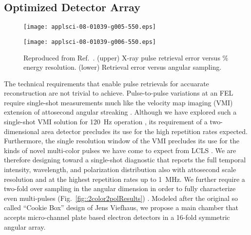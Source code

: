 \subsection*{Optimized Detector Array}
%

\begin{wrapfigure}[26]{r}{3in}
\vspace{-3\baselineskip}
\centerline{\texttt{[image: applsci-08-01039-g005-550.eps]}}
\centerline{\texttt{[image: applsci-08-01039-g006-550.eps]}}
\vspace{-1\baselineskip}
\caption{\label{fig::thomasfigs}Reproduced from Ref.~\cite{Feurer2018}. (upper) X-ray pulse retrieval error versus \% energy resolution.  
(lower) Retrieval error versus angular sampling.}
\end{wrapfigure}

The technical requirements that enable pulse retrievals for accuarate reconstruction are not trivial to achieve.
Pulse-to-pulse variations at an FEL require single-shot measurements much like the velocity map imaging (VMI) \cite{VrakkingRSI} extension of attosecond angular streaking \cite{attoclockVMI2013}.
Although we have explored such a single-shot VMI solution for 120~Hz operation \cite{Siqi2018}, its requirement of a two-dimensional area detector precludes its use for the high repetition rates expected. 
Furthermore, the single resolution window of the VMI precludes its use for the kinds of novel multi-color pulses we have come to expect from LCLS \cite{Lutman13_twocolor,Marinelli13_twocolor,Marinelli2015,Lutman2016,LutmanFreshSlice2016}.
We are therefore designing toward a single-shot diagnostic that reports the full temporal intensity, wavelength, and polarization distribution also with attosecond scale resolution and at the highest repetition rates up to 1~MHz.  
We further require a two-fold over sampling in the angular dimension in order to fully characterize even multi-pulses (Fig.~\ref{fig::2color2polResults}) \cite{Lutman2016,LutmanFreshSlice2016}.
Modeled after the original so called ``Cookie Box'' design of Jens Viefhaus, we propose a main chamber that accepts micro-channel plate based electron detectors in a 16-fold symmetric angular array.

